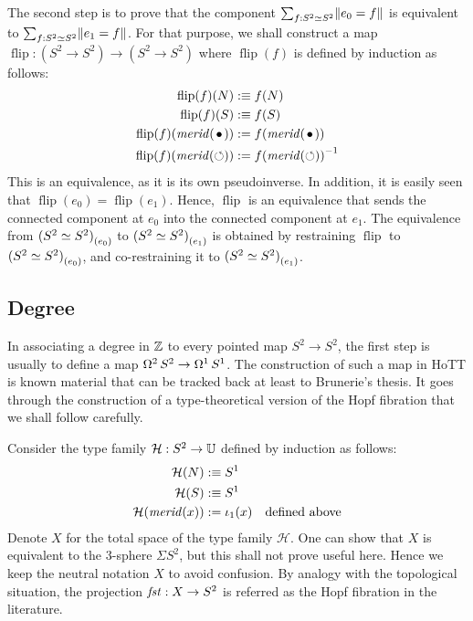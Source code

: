 \documentclass[english,a4]{article}
\newcommand{\Sp}{{S^2}}%
\newcommand{\mrd}{\mathit{merid}}%
\newcommand{\susp}[1]{\Sigma{#1}}%
\newcommand{\Truncprop}[1]{\Trunc{#1}}%
\newcommand{\flip}{\operatorname{flip}}%
\newcommand{\conncomp}[2]{{#1}_{(#2)}}%
\def\U{\universe U}%
\begin{document}
The second step is to prove that the component
$\sum_{f:\Sp \weq \Sp}\Truncprop{e_0=f}$ is equivalent to
$\sum_{f:\Sp \weq \Sp}\Truncprop{e_1=f}$. For that purpose, we shall
construct a map $\flip : (\Sp \to \Sp) \to (\Sp \to \Sp)$ where $\flip(f)$
is defined by induction as follows:
\begin{equation}
  \label{eq:19}
  \begin{aligned}
    \flip(f)(N) &\defequi f(N)
    \\
    \flip(f)(S) &\defequi f(S)
    \\
    \flip(f)(\mrd(\base)) &\defis f(\mrd(\base))
    \\
    \flip(f)(\mrd(\Sloop)) &\defis \inv{f(\mrd(\Sloop))}
  \end{aligned}
\end{equation}
This is an equivalence, as it is its own pseudoinverse. In addition,
it is easily seen that $\flip(e_0) = \flip(e_1)$. Hence, $\flip$ is an
equivalence that sends the connected component at $e_0$ into the
connected component at $e_1$. The equivalence from
$\conncomp{(\Sp\weq\Sp)}{e_0}$ to $\conncomp{(\Sp\weq\Sp)}{e_1}$ is
obtained by restraining $\flip$ to $\conncomp{(\Sp\weq\Sp)}{e_0}$, and
co-restraining it to $\conncomp{(\Sp\weq\Sp)}{e_1}$.

\subsection{Degree}
\label{sec:winding-numbers}
\def\hopffam{\mathcal H}%

In associating a degree in $\mathbb{Z}$ to every pointed map $\Sp \to \Sp$,
the first step is usually to define a map
$\loopspace 2 \Sp \to \loopspace 1 \Sc$. The construction of such a
map in HoTT is known material that can be tracked back at least to
Brunerie's thesis. It goes through the construction of a
type-theoretical version of the Hopf fibration that we shall follow
carefully.

Consider the type family $\hopffam : \Sp \to \U$ defined by induction
as follows:
\begin{equation}
  \label{eq:7}
  \begin{aligned}
    \hopffam (N) &\defequi \Sc
    \\
    \hopffam (S) &\defequi \Sc
    \\
    \hopffam (\mrd(x)) &\defis \iota_1(x) \quad\text{defined above}
  \end{aligned}
\end{equation}
Denote $X$ for the total space of the type family $\hopffam$. One can
show that $X$ is equivalent to the 3-sphere $\susp \Sp$, but this
shall not prove useful here. Hence we keep the neutral notation $X$ to
avoid confusion. By analogy with the topological situation, the
projection $\fst : X\to \Sp$ is referred as the Hopf fibration in the
literature.
\end{document}
